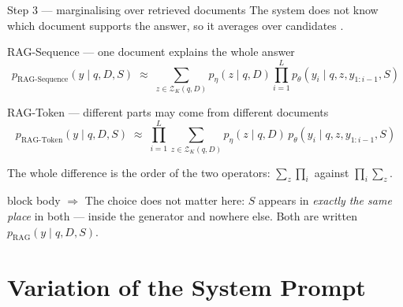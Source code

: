 \documentclass[11pt,aspectratio=169]{beamer}
\begin{document}
\begin{frame}{Step 3 --- marginalising over retrieved documents}
  The system does not know which document supports the answer, so it averages
  over candidates \citep{lewis2020rag}.
  \begin{block}{RAG-Sequence --- one document explains the whole answer}
    \vspace{-1.0em}
    \begin{equation*}
      p_{\text{RAG-Sequence}}(y \mid q,D,S) \;\approx\;
      \sum_{z \in \mathcal{Z}_K(q,D)} p_\eta(z \mid q,D)
      \prod_{i=1}^{L} p_\theta(y_i \mid q,z,y_{1:i-1},S)
    \end{equation*}
  \end{block}
  \vspace{-0.4em}
  \begin{block}{RAG-Token --- different parts may come from different documents}
    \vspace{-1.0em}
    \begin{equation*}
      p_{\text{RAG-Token}}(y \mid q,D,S) \;\approx\;
      \prod_{i=1}^{L} \sum_{z \in \mathcal{Z}_K(q,D)} p_\eta(z \mid q,D)\,
      p_\theta(y_i \mid q,z,y_{1:i-1},S)
    \end{equation*}
  \end{block}
  \vspace{-0.2em}
  \vspace{-0.3em}
  {\small The whole difference is the order of the two operators:
  $\sum_z\prod_i$ against $\prod_i\sum_z$.}
  \vspace{-0.2em}
  \begin{beamercolorbox}[wd=\textwidth,sep=4pt,rounded=true]{block body}\small
  \textbf{$\Rightarrow$} The choice does not matter here: $S$ appears in
  \emph{exactly the same place} in both --- inside the generator and nowhere
  else. Both are written
  $p_{\mathrm{RAG}}(y \mid q,D,S)$.
  \end{beamercolorbox}
\end{frame}

\section{Variation of the System Prompt}
\end{document}
